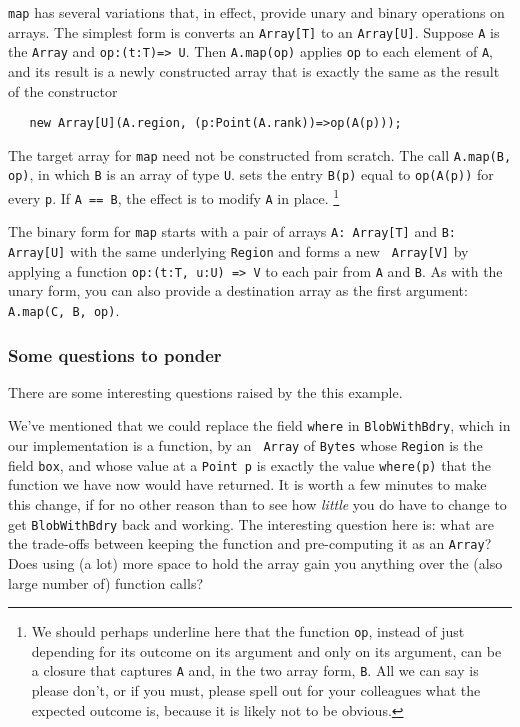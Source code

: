 {\tt map} has several variations that, in effect, provide unary and
binary operations on arrays.  The simplest form is converts an {\tt Array[T]}
to an {\tt Array[U]}.  Suppose {\tt A} is the {\tt Array} and {\tt op:(t:T)=>
U}. Then {\tt A.map(op)} applies {\tt op} to each element of {\tt A}, and its
result is a newly constructed array that is exactly the same as the result of
the constructor
\begin{verbatim}
   new Array[U](A.region, (p:Point(A.rank))=>op(A(p)));
\end{verbatim}

The target array for {\tt map} need not be constructed from scratch.
The call  {\tt A.map(B, op)}, in which {\tt B} is an array of type {\tt U}. sets 
the entry {\tt B(p)} equal to {\tt op(A(p))}
for every {\tt p}.  If {\tt A == B}, the effect is to modify {\tt A} in place.
\footnote{
We should perhaps underline here that the function {\tt op}, instead of just
depending for its outcome on its argument and only on its argument, can be a
closure that captures {\tt A} and, in the two array form, {\tt B}. All we can
say is please don't, or if you must, please spell out for your colleagues what
the expected outcome is, because it is likely not to be obvious. 
}

The binary form for {\tt map} starts with a pair of arrays {\tt A: Array[T]} and
{\tt B: Array[U]} with the same underlying {\tt Region} and forms a new {\tt
Array[V]} by applying a function {\tt op:(t:T, u:U) => V} to each pair from
{\tt A} and {\tt B}.  As with the unary form, you can also provide a
destination array as the first argument: {\tt A.map(C, B, op)}.

\subsubsection{Some questions to ponder}
There are some interesting questions raised by the this example.

We've mentioned that we could replace the field {\tt where}
in {\tt BlobWithBdry}, which in our implementation is a function, by an {\tt
Array} of {\tt Bytes} whose {\tt Region} is the field {\tt box}, 
and whose value at a {\tt Point p} is exactly the value {\tt where(p)} that the
function we have now would have returned.  It is worth a few minutes to make
this change, if for no other reason than to see how {\em little} you do have to
change to get {\tt BlobWithBdry} back and working.  The interesting question
here is: what are the trade-offs
between keeping the function and pre-computing it as an {\tt Array}?  Does
using (a lot) more space to hold the array gain you anything over the
(also large number of) function calls?

